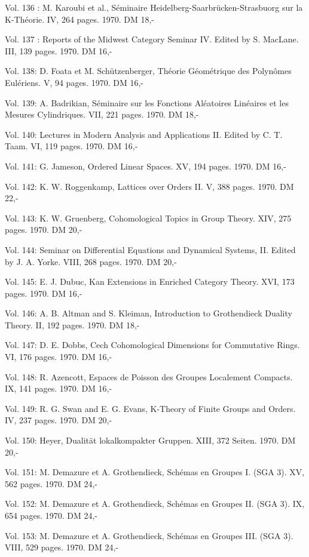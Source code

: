 Vol. 136 : M. Karoubi et al., Séminaire Heidelberg-Saarbrücken-Strasbuorg sur la K-Théorie. IV, 264 pages. 1970. DM 18,-

Vol. 137 : Reports of the Midwest Category Seminar IV. Edited by S. MacLane. III, 139 pages. 1970. DM 16,-

Vol. 138: D. Foata et M. Schützenberger, Théorie Géométrique des Polynômes Eulériens. V, 94 pages. 1970. DM 16,-

Vol. 139: A. Badrikian, Séminaire sur les Fonctions Aléatoires Linéaires et les Mesures Cylindriques. VII, 221 pages. 1970. DM 18,-

Vol. 140: Lectures in Modern Analysis and Applications II. Edited by C. T. Taam. VI, 119 pages. 1970. DM 16,-

Vol. 141: G. Jameson, Ordered Linear Spaces. XV, 194 pages. 1970. DM 16,-

Vol. 142: K. W. Roggenkamp, Lattices over Orders II. V, 388 pages. 1970. DM 22,-

Vol. 143: K. W. Gruenberg, Cohomological Topics in Group Theory. XIV, 275 pages. 1970. DM 20,-

Vol. 144: Seminar on Differential Equations and Dynamical Systems, II. Edited by J. A. Yorke. VIII, 268 pages. 1970. DM 20,-

Vol. 145: E. J. Dubuc, Kan Extensions in Enriched Category Theory. XVI, 173 pages. 1970. DM 16,-

Vol. 146: A. B. Altman and S. Kleiman, Introduction to Grothendieck Duality Theory. II, 192 pages. 1970. DM 18,-

Vol. 147: D. E. Dobbs, Cech Cohomological Dimensions for Commutative Rings. VI, 176 pages. 1970. DM 16,-

Vol. 148: R. Azencott, Espaces de Poisson des Groupes Localement Compacts. IX, 141 pages. 1970. DM 16,-

Vol. 149: R. G. Swan and E. G. Evans, K-Theory of Finite Groups and Orders. IV, 237 pages. 1970. DM 20,-

Vol. 150: Heyer, Dualität lokalkompakter Gruppen. XIII, 372 Seiten. 1970. DM 20,-

Vol. 151: M. Demazure et A. Grothendieck, Schémas en Groupes I. (SGA 3). XV, 562 pages. 1970. DM 24,-

Vol. 152: M. Demazure et A. Grothendieck, Schémas en Groupes II. (SGA 3). IX, 654 pages. 1970. DM 24,-

Vol. 153: M. Demazure et A. Grothendieck, Schémas en Groupes III. (SGA 3). VIII, 529 pages. 1970. DM 24,-

